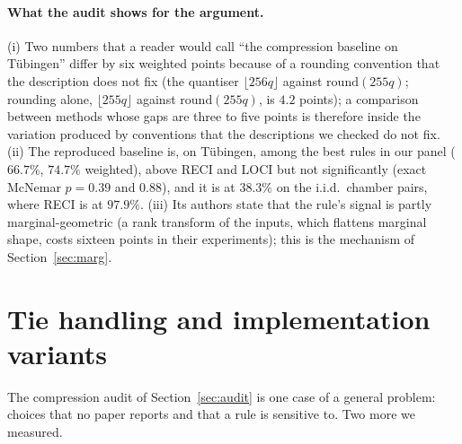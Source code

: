 \paragraph{What the audit shows for the argument.} (i) Two numbers that a reader would call ``the compression baseline on T\"ubingen'' differ by six weighted points because of a rounding convention that the description does not fix (the quantiser $\lfloor 256q\rfloor$ against $\mathrm{round}(255q)$; rounding alone, $\lfloor 255q\rfloor$ against $\mathrm{round}(255q)$, is $4.2$ points); a comparison between methods whose gaps are three to five points is therefore inside the variation produced by conventions that the descriptions we checked do not fix. (ii) The reproduced baseline is, on T\"ubingen, among the best rules in our panel ($66.7\%$, $74.7\%$ weighted), above RECI and LOCI but not significantly (exact McNemar $p=0.39$ and $0.88$), and it is at $38.3\%$ on the i.i.d.\ chamber pairs, where RECI is at $97.9\%$. (iii) Its authors state that the rule's signal is partly marginal-geometric (a rank transform of the inputs, which flattens marginal shape, costs sixteen points in their experiments); this is the mechanism of Section~\ref{sec:marg}.

\section{Tie handling and implementation variants}\label{sec:ties}

The compression audit of Section~\ref{sec:audit} is one case of a general problem: choices that no paper reports and that a rule is sensitive to. Two more we measured.

